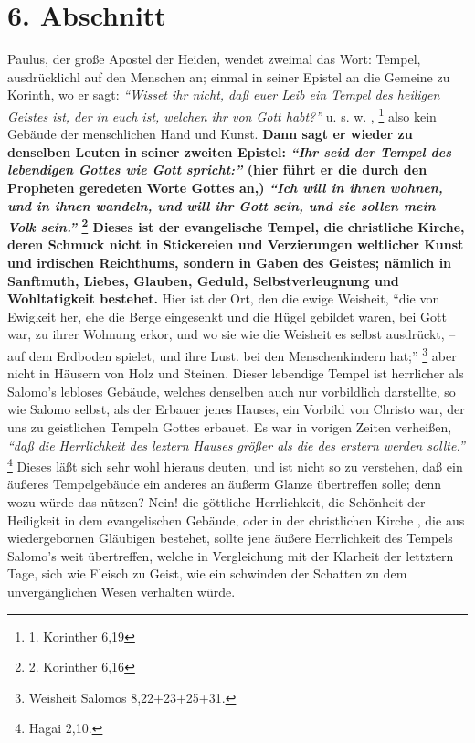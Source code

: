 \section{6. Abschnitt} \label{kap5_ab6}

 
Paulus, der große Apostel der Heiden, wendet zweimal das Wort: Tempel,
ausdrücklichl auf den Menschen an; einmal in seiner Epistel an die Gemeine zu
Korinth, wo er sagt:
\textit{"`Wisset ihr nicht, daß euer Leib ein Tempel des heiligen
Geistes ist, der in euch ist, welchen ihr von Gott habt?"'} u. s. w. ,
\footnote{1. Korinther 6,19}
also kein Gebäude der menschlichen Hand und Kunst. \textbf{Dann sagt er
wieder zu denselben Leuten in seiner zweiten Epistel:
\textit{"`Ihr seid der Tempel des lebendigen Gottes wie Gott spricht:"'} (hier
führt er die durch den Propheten
geredeten Worte Gottes an,)
\textit{"`Ich will in ihnen wohnen, und in ihnen wandeln, und will ihr Gott
sein, und sie sollen mein Volk sein."'}
\footnote{2. Korinther 6,16}
Dieses ist der
evangelische Tempel, die christliche Kirche, deren
Schmuck nicht in Stickereien
und Verzierungen weltlicher Kunst und irdischen Reichthums, sondern in Gaben des
Geistes; nämlich in Sanftmuth, Liebes, Glauben, Geduld,
Selbstverleugnung und
Wohltatigkeit bestehet.} Hier ist der Ort, den die ewige Weisheit,  "`die von
Ewigkeit her, ehe die Berge eingesenkt und die Hügel gebildet waren, bei Gott
war, zu ihrer Wohnung erkor, und wo sie wie die Weisheit es selbst ausdrückt, --
auf dem Erdboden spielet, und ihre Lust. bei den Menschenkindern
hat;"'
\footnote{Weisheit Salomos 8,22+23+25+31.}
aber nicht in Häusern von Holz
und Steinen. Dieser lebendige Tempel ist herrlicher als Salomo's lebloses
Gebäude, welches denselben auch nur vorbildlich darstellte, so wie Salomo
selbst, als der Erbauer jenes Hauses, ein Vorbild von Christo war, der uns zu
geistlichen Tempeln Gottes erbauet. Es war in vorigen Zeiten verheißen,
\textit{"`daß die Herrlichkeit des leztern Hauses größer als die des erstern
werden
sollte."'}
\footnote{Hagai 2,10.}
Dieses läßt sich sehr wohl hieraus deuten, und
ist nicht so zu verstehen, daß ein äußeres Tempelgebäude ein anderes an äußerm
Glanze übertreffen solle; denn wozu würde das nützen? Nein! die göttliche
Herrlichkeit, die Schönheit der Heiligkeit in dem evangelischen Gebäude, oder in
der christlichen Kirche ,
die aus wiedergebornen  Gläubigen bestehet, sollte jene
äußere Herrlichkeit des Tempels Salomo’s weit übertreffen, welche in
Vergleichung mit der Klarheit der lettztern Tage, sich wie Fleisch zu Geist, wie
ein schwinden der Schatten zu dem unvergänglichen Wesen verhalten würde.

